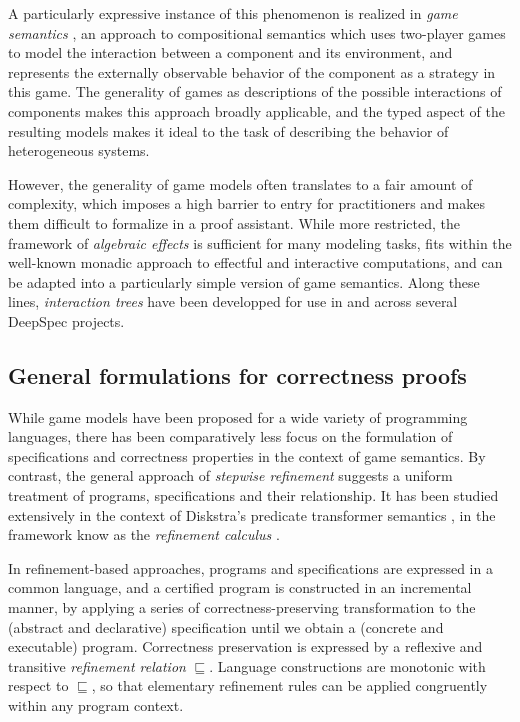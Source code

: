 \documentclass[sigplan,screen]{acmart}
\begin{document}
A particularly expressive instance of this phenomenon
is realized in \emph{game semantics} \cite{cspgs},
an approach to compositional semantics
which uses two-player games to model
the interaction between a component and its environment,
and represents the externally observable behavior
of the component as a strategy in this game.
The generality of games as
descriptions of the possible interactions of components
makes this approach broadly applicable,
and the typed aspect of the resulting models
makes it ideal to the task of
describing the behavior of heterogeneous systems.

However,
the generality of game models
often translates to a fair amount of complexity,
which imposes a high barrier to entry for practitioners
and makes them difficult to formalize in a proof assistant.
While more restricted,
the framework of \emph{algebraic effects} \cite{effadq}
is sufficient for many modeling tasks,
fits within the well-known monadic approach
to effectful and interactive computations,
and can be adapted into a particularly simple version
of game semantics.
Along these lines,
\emph{interaction trees} \cite{itree}
have been developped for use in and across
several DeepSpec projects.

\subsection{General formulations for correctness proofs}

While game models have been proposed
for a wide variety of programming languages,
there has been comparatively less focus
on the formulation of specifications and correctness properties
in the context of game semantics.
By contrast,
the general approach of \emph{stepwise refinement}
suggests a uniform treatment of programs, specifications
and their relationship.
It has been studied extensively in the context of
Diskstra's predicate transformer semantics \cite{gc},
in the framework know as the \emph{refinement calculus} \cite{refcal}.

In refinement-based approaches,
programs and specifications are expressed in a common language,
and a certified program is constructed in an incremental manner,
by applying a series of correctness-preserving transformation
to the (abstract and declarative) specification
until we obtain a (concrete and executable) program.
Correctness preservation is expressed
by a reflexive and transitive \emph{refinement relation} $\sqsubseteq$.
Language constructions are monotonic with respect to $\sqsubseteq$,
so that elementary refinement rules
can be applied congruently within any program context.
\end{document}
